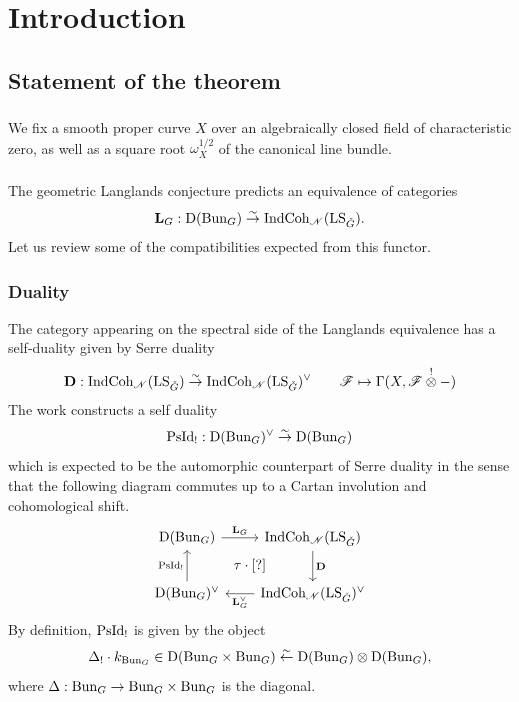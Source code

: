 \section{Introduction}

\subsection{Statement of the theorem}

\subsubsection{} We fix a smooth proper curve $X$ over an algebraically closed field of characteristic zero, as well as a square root $\omega_X^{1/2}$ of the canonical line bundle.

\subsubsection{} The geometric Langlands conjecture \cite{ss_indcoh} predicts an equivalence of categories
    \[\mathbf{L}_G : \mathrm{D}(\mathrm{Bun}_G) \overset{\sim}{\rightarrow} \mathrm{IndCoh}_{\mathscr{N}}(\mathrm{LS}_{\check{G}}).\]
Let us review some of the compatibilities expected from this functor.

\subsubsection{Duality} The category appearing on the spectral side of the Langlands equivalence has a self-duality given by Serre duality
    \[
    \mathbf{D} : \mathrm{IndCoh}_{\mathscr{N}}(\mathrm{LS}_{\check{G}}) \overset{\sim}{\rightarrow} \mathrm{IndCoh}_{\mathscr{N}}(\mathrm{LS}_{\check{G}})^\vee
    \qquad
    \mathscr{F} \mapsto \Gamma (X, \mathscr{F} \overset{!}{\otimes} -)
    \]
The work \cite{strange} constructs a self duality
    \[
    \mathrm{PsId}_! : \mathrm{D}(\mathrm{Bun}_G)^\vee \overset{\sim}{\rightarrow} \mathrm{D}(\mathrm{Bun}_G)
    \]
which is expected to be the automorphic counterpart of Serre duality in the sense that the following diagram commutes up to a Cartan involution and cohomological shift.
\begin{equation}
\label{eqn:Serre_PsId_no_shift}
\begin{tikzcd}[
  column sep={9em,between origins},
  row sep={4em,between origins}
]
  \DMod(\Bun_G) \arrow[r, "\GLL_G"] \arrow[dr, phantom, "\tau \cdot {[?]}"] & \ICoh_\Nilp(\LS_\LG) \arrow[d, "\DD"] \\
  \DMod(\Bun_G)^\vee \arrow[u, "\PsId_!"] & \ICoh_\Nilp(\LS_\LG)^\vee \arrow[l, "\GLL_G^\vee"]
\end{tikzcd}
\end{equation}
By definition, $\mathrm{PsId}_!$ is given by the object
    \[
    \Delta_! \cdot k_{\mathrm{Bun}_G} \in
    \mathrm{D}(\mathrm{Bun}_G \times \mathrm{Bun}_G)
    \overset{\sim}{\leftarrow} \mathrm{D}(\mathrm{Bun}_G) \otimes \mathrm{D}(\mathrm{Bun}_G),
    \]
where $\Delta : \mathrm{Bun}_G \to \mathrm{Bun}_G \times \mathrm{Bun}_G$ is the diagonal.

